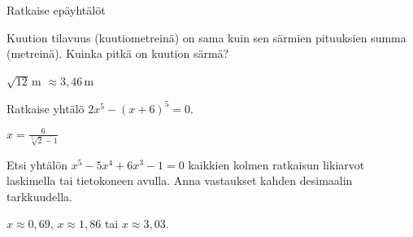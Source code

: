 \begin{multicols}{2}
\begin{tehtava} 
Ratkaise epäyhtälöt
     \begin{vastaus}
    \end{vastaus}
\end{tehtava}

\begin{tehtava} 
Kuution tilavuus (kuutiometreinä) on sama kuin sen särmien pituuksien summa (metreinä). Kuinka pitkä on kuution särmä?
    \begin{vastaus}
		$\sqrt{12}$\,m $\approx 3,46$\,m
    \end{vastaus}
\end{tehtava}

\begin{tehtava} 
Ratkaise yhtälö $2x^5-(x+6)^5=0$.
    \begin{vastaus}
	$x=\frac{6}{\sqrt[5]{2}-1}$
    \end{vastaus}
\end{tehtava}

\begin{tehtava}
Etsi yhtälön $x^5-5x^4+6x^3-1=0$ kaikkien kolmen ratkaisun likiarvot laskimella tai tietokoneen avulla. Anna vastaukset kahden desimaalin tarkkuudella.
    \begin{vastaus}
	$x \approx 0,69$, $x \approx 1,86$ tai $x \approx 3,03$.
    \end{vastaus}
\end{tehtava}

\end{multicols}
